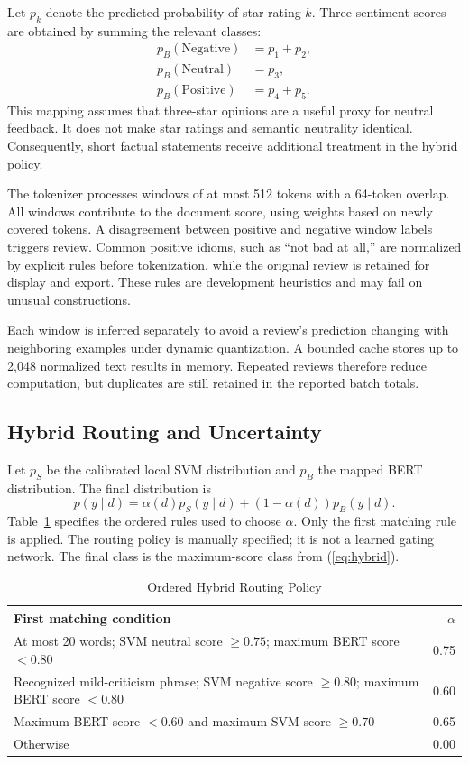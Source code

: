 \documentclass[conference,a4paper]{IEEEtran}
\begin{document}
Let $p_k$ denote the predicted probability of star rating $k$. Three sentiment scores are obtained by summing the relevant classes:
\begin{align}
p_B(\mathrm{Negative}) &= p_1+p_2,\\
p_B(\mathrm{Neutral}) &= p_3,\\
p_B(\mathrm{Positive}) &= p_4+p_5.
\end{align}
This mapping assumes that three-star opinions are a useful proxy for neutral feedback. It does not make star ratings and semantic neutrality identical. Consequently, short factual statements receive additional treatment in the hybrid policy.

The tokenizer processes windows of at most 512 tokens with a 64-token overlap. All windows contribute to the document score, using weights based on newly covered tokens. A disagreement between positive and negative window labels triggers review. Common positive idioms, such as ``not bad at all,'' are normalized by explicit rules before tokenization, while the original review is retained for display and export. These rules are development heuristics and may fail on unusual constructions.

Each window is inferred separately to avoid a review's prediction changing with neighboring examples under dynamic quantization. A bounded cache stores up to 2,048 normalized text results in memory. Repeated reviews therefore reduce computation, but duplicates are still retained in the reported batch totals.

\subsection{Hybrid Routing and Uncertainty}
Let $p_S$ be the calibrated local SVM distribution and $p_B$ the mapped BERT distribution. The final distribution is
\begin{equation}
p(y\mid d)=\alpha(d)p_S(y\mid d)+(1-\alpha(d))p_B(y\mid d).
\label{eq:hybrid}
\end{equation}
Table~\ref{tab:routing} specifies the ordered rules used to choose $\alpha$. Only the first matching rule is applied. The routing policy is manually specified; it is not a learned gating network. The final class is the maximum-score class from (\ref{eq:hybrid}).

\begin{table}[t]
\caption{Ordered Hybrid Routing Policy}
\label{tab:routing}
\centering\footnotesize
\begin{tabular}{p{}r}
\toprule
First matching condition & $\alpha$\\\midrule
At most 20 words; SVM neutral score $\geq0.75$; maximum BERT score $<0.80$ & 0.75\\
Recognized mild-criticism phrase; SVM negative score $\geq0.80$; maximum BERT score $<0.80$ & 0.60\\
Maximum BERT score $<0.60$ and maximum SVM score $\geq0.70$ & 0.65\\
Otherwise & 0.00\\\bottomrule
\end{tabular}
\end{table}
\end{document}
